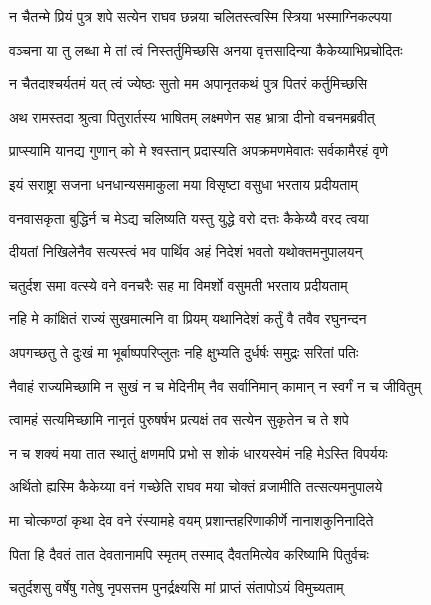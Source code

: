 \twolineshloka
{न चैतन्मे प्रियं पुत्र शपे सत्येन राघव}
{छन्नया चलितस्त्वस्मि स्त्रिया भस्माग्निकल्पया} %

\twolineshloka
{वञ्चना या तु लब्धा मे तां त्वं निस्तर्तुमिच्छसि}
{अनया वृत्तसादिन्या कैकेय्याभिप्रचोदितः} %

\twolineshloka
{न चैतदाश्चर्यतमं यत् त्वं ज्येष्ठः सुतो मम}
{अपानृतकथं पुत्र पितरं कर्तुमिच्छसि} %

\twolineshloka
{अथ रामस्तदा श्रुत्वा पितुरार्तस्य भाषितम्}
{लक्ष्मणेन सह भ्रात्रा दीनो वचनमब्रवीत्} %

\twolineshloka
{प्राप्स्यामि यानद्य गुणान् को मे श्वस्तान् प्रदास्यति}
{अपक्रमणमेवातः सर्वकामैरहं वृणे} %

\twolineshloka
{इयं सराष्ट्रा सजना धनधान्यसमाकुला}
{मया विसृष्टा वसुधा भरताय प्रदीयताम्} %

\twolineshloka
{वनवासकृता बुद्धिर्न च मेऽद्य चलिष्यति}
{यस्तु युद्धे वरो दत्तः कैकेय्यै वरद त्वया} %

\twolineshloka
{दीयतां निखिलेनैव सत्यस्त्वं भव पार्थिव}
{अहं निदेशं भवतो यथोक्तमनुपालयन्} %

\twolineshloka
{चतुर्दश समा वत्स्ये वने वनचरैः सह}
{मा विमर्शो वसुमती भरताय प्रदीयताम्} %

\twolineshloka
{नहि मे कांक्षितं राज्यं सुखमात्मनि वा प्रियम्}
{यथानिदेशं कर्तुं वै तवैव रघुनन्दन} %

\twolineshloka
{अपगच्छतु ते दुःखं मा भूर्बाष्पपरिप्लुतः}
{नहि क्षुभ्यति दुर्धर्षः समुद्रः सरितां पतिः} %

\twolineshloka
{नैवाहं राज्यमिच्छामि न सुखं न च मेदिनीम्}
{नैव सर्वानिमान् कामान् न स्वर्गं न च जीवितुम्} %

\twolineshloka
{त्वामहं सत्यमिच्छामि नानृतं पुरुषर्षभ}
{प्रत्यक्षं तव सत्येन सुकृतेन च ते शपे} %

\twolineshloka
{न च शक्यं मया तात स्थातुं क्षणमपि प्रभो}
{स शोकं धारयस्वेमं नहि मेऽस्ति विपर्ययः} %

\twolineshloka
{अर्थितो ह्यस्मि कैकेय्या वनं गच्छेति राघव}
{मया चोक्तं व्रजामीति तत्सत्यमनुपालये} %

\twolineshloka
{मा चोत्कण्ठां कृथा देव वने रंस्यामहे वयम्}
{प्रशान्तहरिणाकीर्णे नानाशकुनिनादिते} %

\twolineshloka
{पिता हि दैवतं तात देवतानामपि स्मृतम्}
{तस्माद् दैवतमित्येव करिष्यामि पितुर्वचः} %

\twolineshloka
{चतुर्दशसु वर्षेषु गतेषु नृपसत्तम}
{पुनर्द्रक्ष्यसि मां प्राप्तं संतापोऽयं विमुच्यताम्} %

